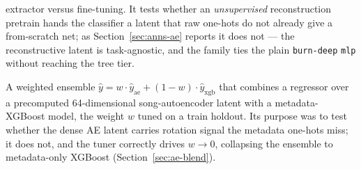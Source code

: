 \documentclass[11pt]{article}
\begin{document}
\begin{description}
  extractor versus fine-tuning. It tests whether an \emph{unsupervised}
  reconstruction pretrain hands the classifier a latent that raw one-hots do
  not already give a from-scratch net; as Section~\ref{sec:anns-ae} reports it
  does not --- the reconstructive latent is task-agnostic, and the family ties
  the plain \texttt{burn-deep} \texttt{mlp} without reaching the tree tier.
  \item[Autoencoder-XGBoost blend (\texttt{autoencoder-xgboost}).] A weighted
  ensemble $\hat{y}=w\cdot\hat{y}_{\text{ae}}+(1-w)\cdot\hat{y}_{\text{xgb}}$
  that combines a regressor over a precomputed 64-dimensional
  song-autoencoder latent with a metadata-XGBoost model, the weight $w$ tuned on
  a train holdout. Its purpose was to test whether the dense AE latent carries
  rotation signal the metadata one-hots miss; it does not, and the tuner
  correctly drives $w\to 0$, collapsing the ensemble to metadata-only XGBoost
  (Section~\ref{sec:ae-blend}).
\end{description}
\end{document}
